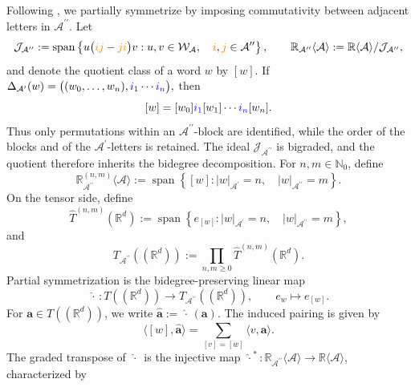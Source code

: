 \documentclass{amsart}
\theoremstyle{definition}
\theoremstyle{remark}
\newcommand{\symmetrizer}{{\,\widehat{\cdot}\,}}
\newcommand{\decomp}[1]{\Delta_{#1}}
\newcommand{\blue}[1]{{\color{blue}#1}}
\newcommand{\orange}[1]{{\color{orange}#1}}
\begin{document}
Following \cite{mainpaper}, we partially symmetrize by imposing
commutativity between adjacent letters in
$\mathcal{A}^{\prime\prime}$. Let
\[
    \mathcal{J}_{\mathcal{A}^{\prime\prime}}
    :=
    \operatorname{span}
    \left\{
        u\bigl(
            \orange{i}\orange{j}
            -
            \orange{j}\orange{i}
        \bigr)v
        :
        u,v\in\mathcal{W}_{\mathcal{A}},
        \quad
        \orange{i},\orange{j}\in\mathcal{A}^{\prime\prime}
    \right\},
    \qquad
    \mathbb{R}_{\mathcal{A}^{\prime\prime}}
    \langle\mathcal{A}\rangle
    :=
    \mathbb{R}\langle\mathcal{A}\rangle
    /
    \mathcal{J}_{\mathcal{A}^{\prime\prime}},
\]
and denote the quotient class of a word $w$ by $[w]$. If $\decomp{\mathcal{A}^{\prime}}(w)
    =
    \bigl(
        (w_0,\ldots,w_n),
        \blue{i_1}\cdots\blue{i_n}
    \bigr),$
then
\[
    [w]
    =
    [w_0]\blue{i_1}[w_1]\cdots
    \blue{i_n}[w_n].
\]
Thus only permutations within an
$\mathcal{A}^{\prime\prime}$-block are identified, while the order of the
blocks and of the $\mathcal{A}^{\prime}$-letters is retained.
The ideal $\mathcal{J}_{\mathcal{A}^{\prime\prime}}$ is bigraded, and the
quotient therefore inherits the bidegree decomposition. For
$n,m\in\mathbb{N}_0$, define
\[
    \mathbb{R}_{\mathcal{A}^{\prime\prime}}^{(n,m)}
    \langle\mathcal{A}\rangle
    :=
    \operatorname{span}
    \left\{
        [w]:
        |w|_{\mathcal{A}^{\prime}}=n,
        \quad
        |w|_{\mathcal{A}^{\prime\prime}}=m
    \right\}.
\]
On the tensor side, define
\[
    \widehat{T}^{(n,m)}(\mathbb{R}^{d})
    :=
    \operatorname{span}
    \left\{
        e_{[w]}:
        |w|_{\mathcal{A}^{\prime}}=n,
        \quad
        |w|_{\mathcal{A}^{\prime\prime}}=m
    \right\},
\]
and
\[
    T_{\mathcal{A}^{\prime\prime}}((\mathbb{R}^{d}))
    :=
    \prod_{n,m\geq0}
    \widehat{T}^{(n,m)}(\mathbb{R}^{d}).
\]
Partial symmetrization is the bidegree-preserving linear map
\[
    \symmetrizer:
    T((\mathbb{R}^{d}))
    \longrightarrow
    T_{\mathcal{A}^{\prime\prime}}((\mathbb{R}^{d})),
    \qquad
    e_w\longmapsto e_{[w]}.
\]
For $\mathbf{a}\in T((\mathbb{R}^{d}))$, we write
$\widehat{\mathbf{a}}:=\symmetrizer(\mathbf{a})$. The induced pairing is
given by
\[
    \big\langle
        [w],
        \widehat{\mathbf{a}}
    \big\rangle
    =
    \sum_{[v]=[w]}
    \big\langle
        v,
        \mathbf{a}
    \big\rangle.
\]
The graded transpose of $\symmetrizer$ is the injective map
$\symmetrizer^{\ast}:\mathbb{R}_{\mathcal{A}^{\prime\prime}}
\langle\mathcal{A}\rangle\to\mathbb{R}\langle\mathcal{A}\rangle$,
characterized by
\end{document}
